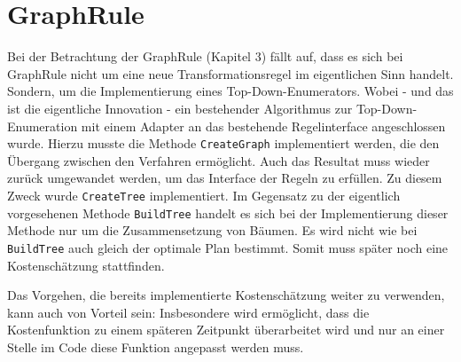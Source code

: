 \section{GraphRule}


Bei der Betrachtung der GraphRule (Kapitel 3) fällt auf, dass es sich bei GraphRule nicht um eine neue Transformationsregel im eigentlichen Sinn handelt. Sondern, um die Implementierung eines Top-Down-Enumerators. Wobei - und das ist die eigentliche Innovation - ein bestehender Algorithmus zur Top-Down-Enumeration mit einem Adapter an das bestehende Regelinterface angeschlossen wurde. Hierzu musste die Methode \texttt{CreateGraph} implementiert werden, die den Übergang zwischen den Verfahren ermöglicht. Auch das Resultat muss wieder zurück umgewandet werden, um das Interface der Regeln zu erfüllen. Zu diesem Zweck wurde \texttt{CreateTree} implementiert. Im Gegensatz zu der eigentlich vorgesehenen Methode \texttt{BuildTree} handelt es sich bei der Implementierung dieser Methode nur um die Zusammensetzung von Bäumen. Es wird nicht wie bei \texttt{BuildTree} auch gleich der optimale Plan bestimmt. Somit muss später noch eine Kostenschätzung stattfinden.

Das Vorgehen, die bereits implementierte Kostenschätzung weiter zu verwenden, kann auch von Vorteil sein: Insbesondere wird ermöglicht, dass die Kostenfunktion zu einem späteren Zeitpunkt überarbeitet wird und nur an einer Stelle im Code diese Funktion angepasst werden muss.